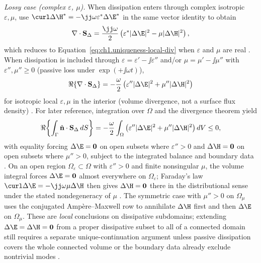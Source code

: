 \emph{Lossy case (complex $\varepsilon$, $\mu$).} When dissipation enters through complex isotropic $\varepsilon,\mu$, use $\curl\Delta\H^*=-\jj\omega\varepsilon^*\Delta\E^*$ in the same vector identity to obtain
\begin{equation}
\label{eq:ch1.uniqueness-local-div-complex}
\nabla\cdot\mathbf{S}_\Delta
=\frac{\jj\omega}{2}\left(\varepsilon^*|\Delta\E|^{2}-\mu|\Delta\H|^{2}\right),
\end{equation}
which reduces to Equation~\eqref{eq:ch1.uniqueness-local-div} when $\varepsilon$ and $\mu$ are real \cite{stratton1941,harrington2001}. When dissipation is included through $\varepsilon=\varepsilon'-\jj\varepsilon''$ and/or $\mu=\mu'-\jj\mu''$ with $\varepsilon'',\mu''\ge0$ (passive loss under $\exp(+\jj\omega t)$),
\[
\Re\{\nabla\cdot\mathbf{S}_\Delta\}
=-\frac{\omega}{2}\left(\varepsilon''|\Delta\E|^{2}+\mu''|\Delta\H|^{2}\right)
\]
for isotropic local $\varepsilon,\mu$ in the interior (volume divergence, not a surface flux density) \cite{stratton1941,harrington2001}. For later reference, integration over $\Omega$ and the divergence theorem yield
\[
\Re\!\left\{\int_{\Gamma}\hat{\mathbf{n}}\cdot\mathbf{S}_\Delta\,dS\right\}
=-\frac{\omega}{2}\int_{\Omega}\left(\varepsilon''|\Delta\E|^{2}+\mu''|\Delta\H|^{2}\right)dV
\le 0,
\]
with equality forcing $\Delta\E=\mathbf{0}$ on open subsets where $\varepsilon''>0$ and $\Delta\H=\mathbf{0}$ on open subsets where $\mu''>0$, subject to the integrated balance and boundary data \cite{stratton1941,harrington2001}. On an open region $\Omega_\varepsilon\subset\Omega$ with $\varepsilon''>0$ and finite nonsingular $\mu$, the volume integral forces $\Delta\E=\mathbf{0}$ almost everywhere on $\Omega_\varepsilon$; Faraday's law $\curl\Delta\E=-\jj\omega\mu\Delta\H$ then gives $\Delta\H=\mathbf{0}$ there in the distributional sense under the stated nondegeneracy of $\mu$ \cite{stratton1941,harrington2001}. The symmetric case with $\mu''>0$ on $\Omega_\mu$ uses the conjugated Amp\`ere--Maxwell row to annihilate $\Delta\H$ first and then $\Delta\E$ on $\Omega_\mu$. These are \emph{local} conclusions on dissipative subdomains; extending $\Delta\E=\Delta\H=\mathbf{0}$ from a proper dissipative subset to all of a connected domain still requires a separate unique-continuation argument unless passive dissipation covers the whole connected volume or the boundary data already exclude nontrivial modes \cite{stratton1941,harrington2001}.

